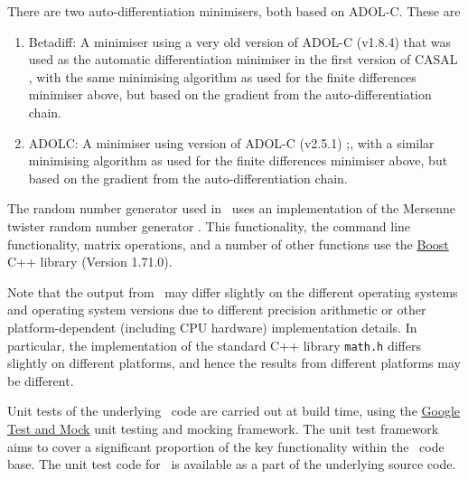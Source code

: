 There are two auto-differentiation minimisers, both based on ADOL-C. These are
\begin{enumerate}
\item Betadiff: A minimiser using a very old version of ADOL-C (v1.8.4) that was used as the automatic differentiation minimiser in the first version of CASAL \citep{1388}, with the same minimising algorithm as used for the finite differences minimiser above, but based on the gradient from the auto-differentiation chain.
\item ADOLC: A minimiser using version of ADOL-C (v2.5.1) \citep{walther1996adolc};, with a similar minimising algorithm as used for the finite differences minimiser above, but based on the gradient from the auto-differentiation chain.
\end{enumerate}

The random number generator used in \CNAME\ uses an implementation of the Mersenne twister random number generator \citep{796}. This functionality, the command line functionality, matrix operations, and a number of other functions use the \href{http://www.boost.org/}{Boost} C++ library (Version 1.71.0).

Note that the output from \CNAME\ may differ slightly on the different operating systems and operating system versions due to different precision arithmetic or other platform-dependent (including CPU hardware) implementation details. In particular, the implementation of the standard C++ library \texttt{math.h} differs slightly on different platforms, and hence the results from different platforms may be different.

Unit tests of the underlying \CNAME\ code are carried out at build time, using the \href{https://github.com/google/googletest}{Google Test and Mock} unit testing and mocking framework. The unit test framework aims to cover a significant proportion of the key functionality within the \CNAME\ code base. The unit test code for \CNAME\ is available as a part of the underlying source code.

